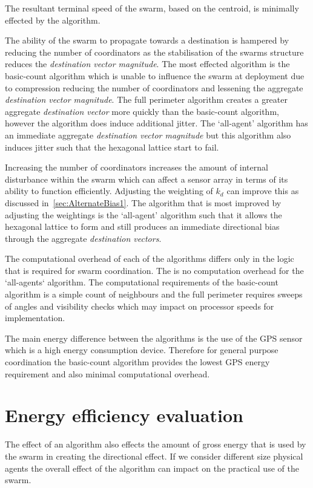 The resultant terminal speed of the swarm, based on the centroid, is minimally effected by the algorithm. 

The ability of the swarm to propagate towards a destination is hampered by reducing the number of coordinators as the stabilisation of the swarms structure reduces the \textit{destination vector magnitude}. The most effected algorithm is the basic-count algorithm which is unable to influence the swarm at deployment due to compression reducing the number of coordinators and lessening the aggregate \textit{destination vector magnitude}. The full perimeter algorithm creates a greater aggregate \textit{destination vector} more quickly than the basic-count algorithm, however the algorithm does induce additional jitter. The `all-agent' algorithm has an immediate aggregate \textit{destination vector magnitude} but this algorithm also induces jitter such that the hexagonal lattice start to fail.
 
Increasing the number of coordinators increases the amount of internal disturbance within the swarm which can affect a sensor array in terms of its ability to function efficiently. Adjusting the weighting of $k_d$ can improve this as discussed in~\autoref{sec:AlternateBias1}. The algorithm that is most improved by adjusting the weightings is the `all-agent' algorithm such that it allows the hexagonal lattice to form and still produces an immediate directional bias through the aggregate \textit{destination vectors}.  

The computational overhead of each of the algorithms differs only in the logic that is required for swarm coordination. The is no computation overhead for the `all-agents` algorithm. The computational requirements of the basic-count algorithm is a simple count of neighbours and the full perimeter requires sweeps of angles and visibility checks which may impact on processor speeds for implementation. 

The main energy difference between the algorithms is the use of the GPS sensor which is a high energy consumption device. Therefore for general purpose coordination the basic-count algorithm provides the lowest GPS energy requirement and also minimal computational overhead.

\section{Energy efficiency evaluation\label{reduced:EnergyReductionGPS}}
The effect of an algorithm also effects the amount of gross energy that is used by the swarm in creating the directional effect. If we consider different size physical agents the overall effect of the algorithm can impact on the practical use of the swarm.

